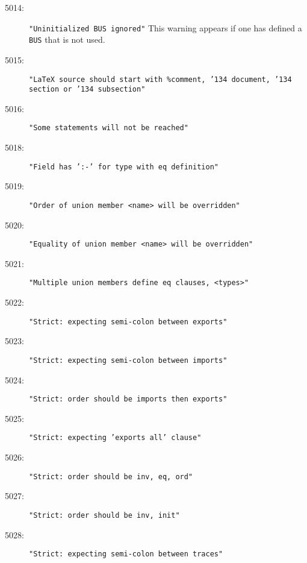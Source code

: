 \begin{description}
\item[5014:] \texttt{"Uninitialized BUS ignored"}  This warning appears
  if one has defined a \texttt{BUS} that is not used.
\item[5015:] \texttt{"LaTeX source should start with \%comment,
  \char'134 document, \char'134 section or \char'134 subsection"  }
\item[5016:] \texttt{"Some statements will not be reached"}
\item[5018:] \texttt{"Field has ':-' for type with eq definition"}
\item[5019:] \texttt{"Order of union member <name> will be overridden"}
\item[5020:] \texttt{"Equality of union member <name> will be overridden"}
\item[5021:] \texttt{"Multiple union members define eq clauses, <types>"}
\item[5022:] \texttt{"Strict: expecting semi-colon between exports"}
\item[5023:] \texttt{"Strict: expecting semi-colon between imports"}
\item[5024:] \texttt{"Strict: order should be imports then exports"}
\item[5025:] \texttt{"Strict: expecting 'exports all' clause"}
\item[5026:] \texttt{"Strict: order should be inv, eq, ord"}
\item[5027:] \texttt{"Strict: order should be inv, init"}
\item[5028:] \texttt{"Strict: expecting semi-colon between traces"}

\end{description}
